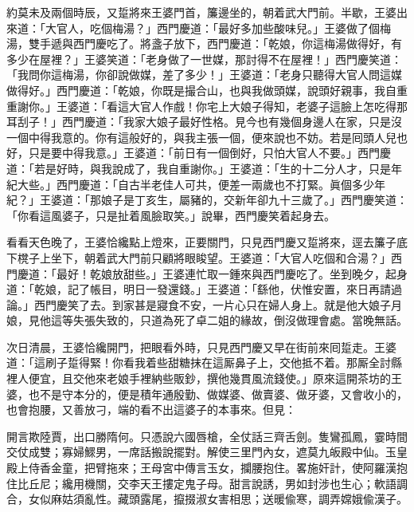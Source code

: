 約莫未及兩個時辰，又踅將來王婆門首，簾邊坐的，朝着武大門前。半歇，王婆出來道：「大官人，吃個梅湯？」西門慶道：「最好多加些酸味兒。」王婆做了個梅湯，雙手遞與西門慶吃了。將盞子放下，西門慶道：「乾娘，你這梅湯做得好，有多少在屋裡？」王婆笑道：「老身做了一世媒，那討得不在屋裡！」西門慶笑道：「我問你這梅湯，你卻說做媒，差了多少！」王婆道：「老身只聽得大官人問這媒做得好。」西門慶道：「乾娘，你既是撮合山，也與我做頭媒，說頭好親事，{}我自重重謝你。」王婆道：「看這大官人作戲！你宅上大娘子得知，老婆子這臉上怎吃得那耳刮子！」西門慶道：「我家大娘子最好性格。見今也有幾個身邊人在家，只是沒一個中得我意的。你有這般好的，與我主張一個，便來說也不妨。若是囘頭人兒也好，{}只是要中得我意。」王婆道：「前日有一個倒好，只怕大官人不要。」西門慶道：「若是好時，與我說成了，我自重謝你。」王婆道：「生的十二分人才，只是年紀大些。」西門慶道：「自古半老佳人可共，便差一兩歲也不打緊。眞個多少年紀？」王婆道：「那娘子是丁亥生，屬豬的，交新年卻九十三歲了。」{}西門慶笑道：「你看這風婆子，只是扯着風臉取笑。」說畢，西門慶笑着起身去。

看看天色晚了，王婆恰纔點上燈來，正要關門，只見西門慶又踅將來，逕去簾子底下櫈子上坐下，朝着武大門前只顧將眼睃望。{}王婆道：「大官人吃個和合湯？」西門慶道：「最好！乾娘放甜些。」王婆連忙取一鍾來與西門慶吃了。坐到晚夕，起身道：「乾娘，記了帳目，明日一發還錢。」王婆道：「繇他，伏惟安置，來日再請過論。」西門慶笑了去。到家甚是寢食不安，一片心只在婦人身上。就是他大娘子月娘，{}見他這等失張失致的，只道為死了卓二姐的緣故，倒沒做理會處。當晚無話。

次日清晨，王婆恰纔開門，把眼看外時，只見西門慶又早在街前來囘踅走。王婆道：「這刷子踅得緊！你看我着些甜糖抹在這厮鼻子上，交他抵不着。那厮全討縣裡人便宜，且交他來老娘手裡納些販鈔，撰他幾貫風流錢使。」原來這開茶坊的王婆，也不是守本分的，便是積年通殷勤、做媒婆、做賣婆、做牙婆，又會收小的，也會抱腰，又善放刁，端的看不出這婆子的本事來。但見：

\begin{myquote}
開言欺陸賈，出口勝隋何。只憑說六國唇槍，全仗話三齊舌劍。隻鸞孤鳳，霎時間交仗成雙；寡婦鰥男，一席話搬說擺對。解使三里門內女，遮莫九皈殿中仙。玉皇殿上侍香金童，把臂拖來；王母宮中傳言玉女，攔腰抱住。畧施奸計，使阿羅漢抱住比丘尼；纔用機關，交李天王摟定鬼子母。甜言說誘，男如封涉也生心；軟語調合，女似麻姑須亂性。藏頭露尾，攛掇淑女害相思；送暖偸寒，調弄嫦娥偸漢子。
\end{myquote}

